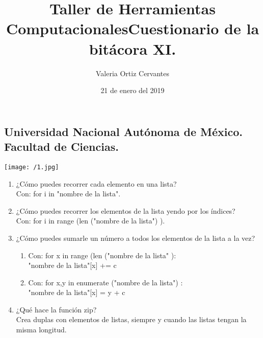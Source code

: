 \documentclass{article} %
\title{\Huge Taller de Herramientas Computacionales}
\author{\huge Valeria Ortiz Cervantes}
\date{\LARGE 21 de enero del 2019}
\begin{document}
\maketitle
\begin{center}
	\subsection*{\LARGE Universidad Nacional Autónoma de México.\\Facultad de Ciencias.\\}
	\texttt{[image: /1.jpg]}
\end{center}
\newpage
\title{\LARGE Cuestionario de la bitácora XI.}
\begin{enumerate}
	\item ¿Cómo puedes recorrer cada elemento en una lista?\\Con: for i in "nombre de la lista".
	\item ¿Cómo puedes recorrer los elementos de la lista yendo por los índices?\\Con: for i in range (len ("nombre de la lista") ).
	\item ¿Cómo puedes sumarle un número a todos los elementos de la lista a la vez?
	\begin{enumerate}
		\item Con: for x in range (len ("nombre de la lista" ):\\"nombre de la lista"[x] += c
		\item Con: for x,y in enumerate ("nombre de la lista") :\\"nombre de la lista"[x] = y + c
	\end{enumerate}
	\item ¿Qué hace la función zip?\\Crea duplas con elementos de listas, siempre y cuando las listas tengan la misma longitud.
\end{enumerate}
\end{document}
